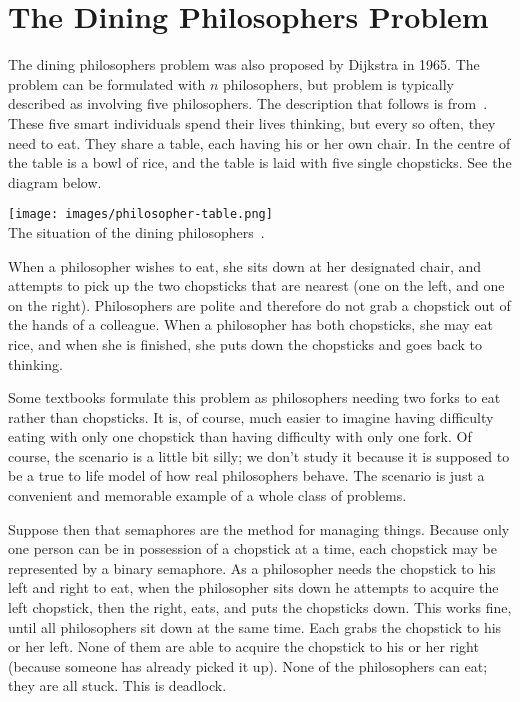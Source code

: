 




\section*{The Dining Philosophers Problem}

The dining philosophers problem was also proposed by Dijkstra in 1965. The problem can be formulated with $n$ philosophers, but problem is typically described as involving five philosophers. The description that follows is from~\cite{osc}. These five smart individuals spend their lives thinking, but every so often, they need to eat. They share a table, each having his or her own chair. In the centre of the table is a bowl of rice, and the table is laid with five single chopsticks. See the diagram below.

\begin{center}
	\texttt{[image: images/philosopher-table.png]}\\
	The situation of the dining philosophers~\cite{osc}.
\end{center}

When a philosopher wishes to eat, she sits down at her designated chair, and attempts to pick up the two chopsticks that are nearest (one on the left, and one on the right). Philosophers are polite and therefore do not grab a chopstick out of the hands of a colleague. When a philosopher has both chopsticks, she may eat rice, and when she is finished, she puts down the chopsticks and goes back to thinking.

Some textbooks formulate this problem as philosophers needing two forks to eat rather than chopsticks. It is, of course, much easier to imagine having difficulty eating with only one chopstick than having difficulty with only one fork. Of course, the scenario is a little bit silly; we don't study it because it is supposed to be a true to life model of how real philosophers behave. The scenario is just a convenient and memorable example of a whole class of problems.

Suppose then that semaphores are the method for managing things. Because only one person can be in possession of a chopstick at a time, each chopstick may be represented by a binary semaphore. As a philosopher needs the chopstick to his left and right to eat, when the philosopher sits down he attempts to acquire the left chopstick, then the right, eats, and puts the chopsticks down. This works fine, until all philosophers sit down at the same time. Each grabs the chopstick to his or her left. None of them are able to acquire the chopstick to his or her right (because someone has already picked it up). None of the philosophers can eat; they are all stuck. This is deadlock.

